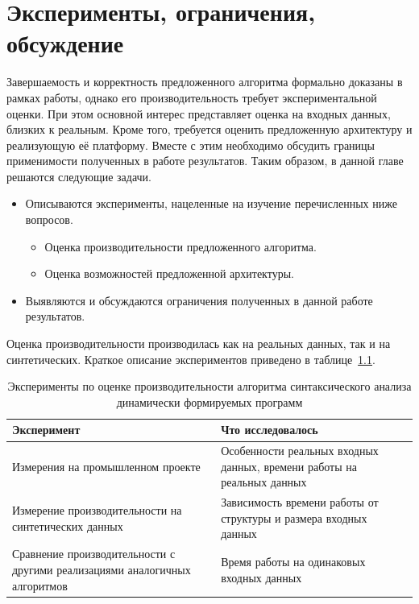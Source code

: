 \chapter{Эксперименты, ограничения, обсуждение} \label{chaptEval}

Завершаемость и корректность предложенного алгоритма формально доказаны в рамках работы, однако его производительность требует экспериментальной оценки. При этом основной интерес представляет оценка на входных данных, близких к реальным. Кроме того, требуется оценить предложенную архитектуру и реализующую её платформу. Вместе с этим необходимо обсудить границы применимости полученных в работе результатов. Таким образом, в данной главе решаются следующие задачи.
\begin{itemize}
  \item Описываются эксперименты, нацеленные на изучение перечисленных ниже вопросов.
  \begin{itemize}
    \item Оценка производительности предложенного алгоритма.
    \item Оценка возможностей предложенной архитектуры.
  \end{itemize}
  \item Выявляются и обсуждаются ограничения полученных в данной работе результатов.
\end{itemize}

Оценка производительности производилась как на реальных данных, так и на синтетических. Краткое описание экспериментов приведено в таблице~\ref{tbl:PerfEval}.

\begin{table} [H]
  \centering
  \parbox{15cm}{\caption{Эксперименты по оценке производительности алгоритма синтаксического анализа динамически формируемых программ}\label{tbl:PerfEval}}
  \begin{tabular}{| p{6cm} | p{9cm}l |}
  \hline                               
  \hline
  Эксперимент & Что исследовалось & \\
  \hline
  \hline 
  Измерения на промышленном проекте                         & Особенности реальных входных данных, времени работы на реальных данных & \\
  \hline
  Измерение производительности на синтетических данных                         & Зависимость времени работы от структуры и размера входных данных & \\
  \hline
  Сравнение производительности с другими реализациями аналогичных алгоритмов   & Время работы на одинаковых входных данных &  \\
  \hline
  \hline
  \end{tabular}
\end{table}

